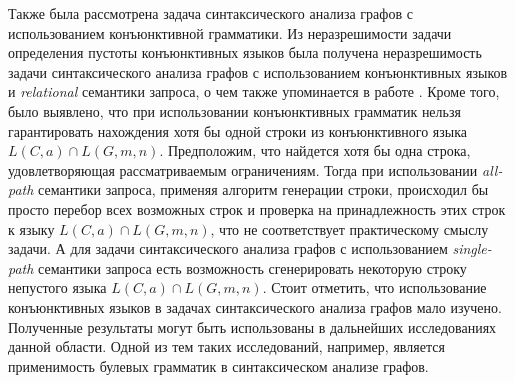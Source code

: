\documentclass[10pt]{article}
\begin{document}
Также была рассмотрена задача синтаксического анализа графов с использованием конъюнктивной грамматики. Из неразрешимости задачи определения пустоты конъюнктивных языков была получена неразрешимость задачи синтаксического анализа графов с использованием конъюнктивных языков и \emph{relational} семантики запроса, о чем также упоминается в работе \cite{azimov-spbu-hellings1}. Кроме того, было выявлено, что при использовании конъюнктивных грамматик нельзя гарантировать нахождения хотя бы одной строки из конъюнктивного языка $L(C,a) \cap L(G,m,n)$. Предположим, что найдется хотя бы одна строка, удовлетворяющая рассматриваемым ограничениям. Тогда при использовании \emph{all-path} семантики запроса, применяя алгоритм генерации строки, происходил бы просто перебор всех возможных строк и проверка на принадлежность этих строк к языку $L(C,a) \cap L(G,m,n)$, что не соответствует практическому смыслу задачи. А для задачи синтаксического анализа графов с использованием \emph{single-path} семантики запроса есть возможность сгенерировать некоторую строку непустого языка $L(C,a) \cap L(G,m,n)$. Стоит отметить, что использование конъюнктивных языков в задачах синтаксического анализа графов мало изучено. Полученные результаты могут быть использованы в дальнейших исследованиях данной области. Одной из тем таких исследований, например, является применимость булевых \cite{azimov-spbu-bool} грамматик в синтаксическом анализе графов.



\end{document}
